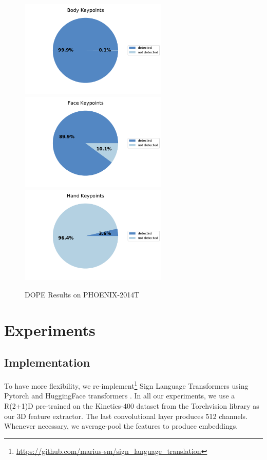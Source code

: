 \documentclass[final]{cvpr}
\begin{document}
\begin{figure}[h]
		\centering
		\includegraphics[width=7cm]{fig/body.pdf}
		\includegraphics[width=7cm]{fig/face.pdf}
		\includegraphics[width=7cm]{fig/hand.pdf}
	\caption{DOPE Results on  PHOENIX-2014T}
	\label{fig:pie_charts}
\end{figure}


\section{Experiments}
\subsection{Implementation}

To have more flexibility, we re-implement\footnote{\url{https://github.com/marius-sm/sign_language_translation}} Sign Language Transformers \cite{neccam} using Pytorch and HuggingFace transformers \cite{huggingface}. In all our experiments, we use a R(2+1)D \cite{r2plus1} pre-trained on the Kinetics-400 \cite{kinetics} dataset from the Torchvision library as our 3D feature extractor. The last convolutional layer produces 512 channels. Whenever necessary, we average-pool the features to produce embeddings.
\end{document}
